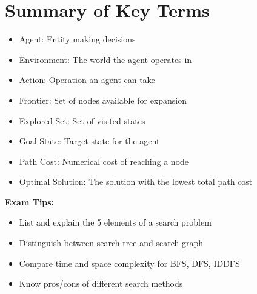 \section{Summary of Key Terms}
\begin{itemize}
    \item Agent: Entity making decisions
    \item Environment: The world the agent operates in
    \item Action: Operation an agent can take
    \item Frontier: Set of nodes available for expansion
    \item Explored Set: Set of visited states
    \item Goal State: Target state for the agent
    \item Path Cost: Numerical cost of reaching a node
    \item Optimal Solution: The solution with the lowest total path cost
\end{itemize}

\textbf{Exam Tips:}
\begin{itemize}
    \item List and explain the 5 elements of a search problem
    \item Distinguish between search tree and search graph
    \item Compare time and space complexity for BFS, DFS, IDDFS
    \item Know pros/cons of different search methods
\end{itemize}
